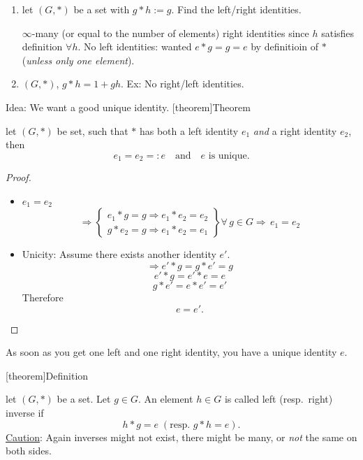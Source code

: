 \documentclass[12pt]{report}
\theoremstyle{definition}
\begin{document}
\begin{ex}
    \;

    \begin{enumerate}
        \item let $(G,*)$ be a set with $g*h:=g$.
            Find the left/right identities.

            $\infty$-many (or equal to the number of elements)
            right identities since $h$ satisfies definition $\forall h$.
            No left identities: wanted $e * g = g = e$ by definitioin of $*$ (\emph{unless only one element}).
        \item $(G, *)$, $g*h = 1 + gh$. 
            Ex: No right/left identities.
    \end{enumerate}
\end{ex}

Idea: We want a good unique identity.
[theorem]{Theorem}
\begin{unique identity}
    let $(G, *)$ be set, such that $*$ has both a left identity $e_1$ \emph{and}
    a right identity $e_2$, then\[
        e_1 = e_2 =: e \quad \text{and} \quad e \text{ is unique.}
    \]
\end{unique identity}

\begin{proof}
    \;

    \begin{itemize}
            \item $e_1 = e_2$
    \[
    \Rightarrow \left\{
        \begin{array}{l}
        e_1 * g = g \Rightarrow e_1 * e_2 = e_2 \\
        g * e_2 = g \Rightarrow e_1 * e_2 = e_1
    \end{array}
\right\} \forall\,g \in G \Rightarrow\,e_1 = e_2%
\]
            \item Unicity: Assume there exists another identity $e'$.\[
                \Rightarrow e' * g = g * e' = g
            \]\[
                e' * g = e' * e = e
            \]\[
                g * e' = e * e' = e'
            \]Therefore \[
                e = e'.
            \]
    \end{itemize}
    
\end{proof}
As soon as you get one left and one right identity, you have a unique identity $e$.

[theorem]{Definition}
\begin{inverse}
    let $(G,*)$ be a set. Let $g \in G$.
    An element $h \in G$ is called left (resp.\ right) inverse if\[
        h * g = e \;(\text{resp. } g * h = e).
    \]
    \underline{Caution}: Again inverses might not exist, 
    there might be many, or \emph{not} the same on both sides.
\end{inverse}
\end{document}
